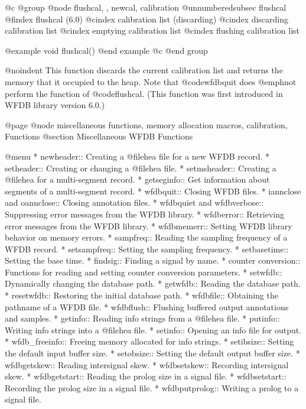 {{{{{{{{@c @group
@node    flushcal, , newcal, calibration
@unnumberedsubsec flushcal
@findex flushcal (6.0)
@cindex calibration list (discarding)
@cindex discarding calibration list
@cindex emptying calibration list
@cindex flushing calibration list

@example
void flushcal()
@end example
@c @end group

@noindent
This function discards the current calibration list and returns the
memory that it occupied to the heap.  Note that @code{wfdbquit} does
@emph{not} perform the function of @code{flushcal}.  (This function was
first introduced in WFDB library version 6.0.)

@page
@node miscellaneous functions, memory allocation macros, calibration, Functions
@section Miscellaneous WFDB Functions

@menu
* newheader::			Creating a @file{hea} file for a new WFDB
				record.
* setheader::			Creating or changing a @file{hea} file.
* setmsheader::                 Creating a @file{hea} for a multi-segment
                                record.
* getseginfo::                  Get information about segments of a
                                multi-segment record.
* wfdbquit::			Closing WFDB files.
* iannclose and oannclose::     Closing annotation files.
* wfdbquiet and wfdbverbose::	Suppressing error messages from the WFDB library.
* wfdberror::			Retrieving error messages from the WFDB library.
* wfdbmemerr::                  Setting WFDB library behavior on memory errors.
* sampfreq::			Reading the sampling frequency of a WFDB record.
* setsampfreq::			Setting the sampling frequency.
* setbasetime::			Setting the base time.
* findsig::                     Finding a signal by name.
* counter conversion::		Functions for reading and setting counter
				conversion parameters.
* setwfdb::			Dynamically changing the database path.
* getwfdb::			Reading the database path.
* resetwfdb::                   Restoring the initial database path.
* wfdbfile::			Obtaining the pathname of a WFDB file.
* wfdbflush::			Flushing buffered output annotations and
				samples.
* getinfo::			Reading info strings from a @file{hea} file.
* putinfo::			Writing info strings into a @file{hea} file.
* setinfo::			Opening an info file for output.
* wfdb_freeinfo::               Freeing memory allocated for info strings.
* setibsize::			Setting the default input buffer size.
* setobsize::			Setting the default output buffer size.
* wfdbgetskew::                 Reading intersignal skew.
* wfdbsetskew::                 Recording intersignal skew.
* wfdbgetstart::                Reading the prolog size in a signal file.
* wfdbsetstart::                Recording the prolog size in a signal file.
* wfdbputprolog::               Writing a prolog to a signal file.

}}}}}}}}
